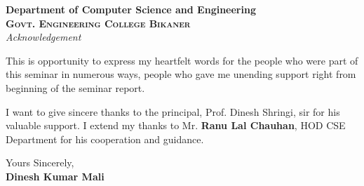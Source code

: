 
\begin{center}
\huge{\textbf{Department of Computer Science and Engineering}}\\[0.5cm]
\normalsize
\textsc{\textbf{Govt. Engineering College Bikaner}}\\[2.0cm]



\emph{\LARGE Acknowledgement}\\[2.5cm]
\end{center}

\normalsize This is opportunity to express my heartfelt words for the people who were part of this seminar in numerous ways, people who gave me unending support right from beginning of the  seminar report.

\vspace{1cm}
I want to give sincere thanks to the principal, Prof. Dinesh Shringi, sir for his valuable support.
I extend my thanks to Mr. \textbf{Ranu Lal Chauhan}, HOD CSE Department for his cooperation and guidance.





\vfill


\begin{flushright}
Yours Sincerely,
\\\textbf{Dinesh Kumar Mali}


\end{flushright}





